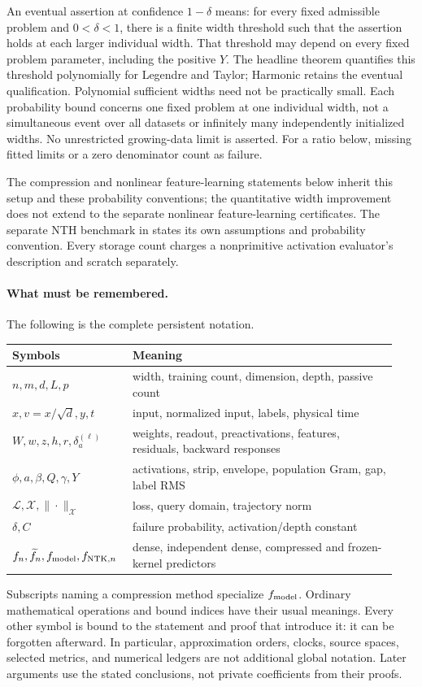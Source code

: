 \documentclass[11pt]{article}
\theoremstyle{definition}
\theoremstyle{remark}
\newcommand{\cL}{\mathcal L}
\begin{document}
An eventual assertion at confidence $1-\delta$ means: for every fixed
admissible problem and $0<\delta<1$, there is a finite width threshold such
that the assertion holds at each larger individual width. That threshold
may depend on every fixed problem parameter, including the positive $Y$.
The headline theorem quantifies this threshold polynomially for Legendre and
Taylor; Harmonic retains the eventual qualification. Polynomial sufficient
widths need not be practically small. Each probability bound concerns one
fixed problem at one individual width, not a simultaneous event over all
datasets or infinitely many independently initialized widths. No unrestricted
growing-data limit is asserted. For a ratio below,
missing fitted limits or a zero denominator count as failure.

The compression and nonlinear feature-learning statements below inherit this
setup and these probability conventions; the quantitative width improvement
does not extend to the separate nonlinear feature-learning certificates.
The separate NTH benchmark in
 states its own assumptions and probability convention.
Every storage count charges a nonprimitive activation evaluator's description
and scratch separately.

\paragraph{What must be remembered.}
The following is the complete persistent notation.
\begin{center}\small
\begin{tabular}{@{}p{0.28\linewidth}p{0.66\linewidth}@{}}
\toprule
Symbols&Meaning\\
\midrule
$n,m,d,L,p$&width, training count, dimension, depth, passive count\\
$x,v=x/\sqrt d,y,t$&input, normalized input, labels, physical time\\
$W,w,z,h,r,\delta_a^{(\ell)}$&weights, readout, preactivations, features,
 residuals, backward responses\\
$\phi,a,\beta,Q,\gamma,Y$&activations, strip, envelope, population Gram,
 gap, label RMS\\
$\cL,\mathcal X,\|\cdot\|_{\mathcal X}$&loss, query domain, trajectory norm\\
$\delta,C$&failure probability, activation/depth constant\\
$f_n,\widetilde f_n,f_{\rm model},f_{\mathrm{NTK},n}$&dense, independent dense,
 compressed and frozen-kernel predictors\\
\bottomrule
\end{tabular}
\end{center}
Subscripts naming a compression method specialize $f_{\rm model}$. Ordinary
mathematical operations and bound indices have their usual meanings.
Every other symbol is bound to the statement and proof that introduce it:
it can be forgotten afterward. In particular, approximation orders, clocks,
source spaces, selected metrics, and numerical ledgers are not additional
global notation. Later arguments use the stated conclusions, not private
coefficients from their proofs.
\end{document}
